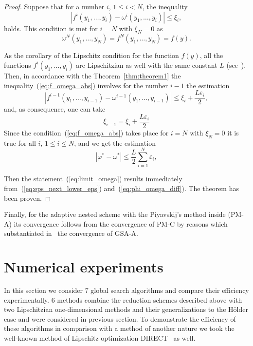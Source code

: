 \documentclass[preprint]{elsarticle}
\begin{document}
\begin{proof}
  Suppose that for a number $i$, $1 \leq i < N$, the inequality
  \begin{equation}
    \label{eq:f_omega_abs}
    | f^i(y_1, \dots, y_i) - \omega^i(y_1, \dots, y_i) | \leq \xi_i,
  \end{equation}
  holds. This condition is met for $i = N$ with $\xi_N = 0$ as
  \begin{equation}
    \omega^N(y_1, \dots, y_N) = f^N(y_1, \dots, y_N) = f(y).
  \end{equation}

  As the corollary of the Lipschitz condition for the function $f(y)$, all the functions $f^i(y_1, \dots, y_i)$ are Lipschitzian as well with the same constant $L$ (see~\cite{bib51}). Then, in accordance with the Theorem~\ref{thm:theorem1} the inequality~(\ref{eq:f_omega_abs}) involves for the number $i - 1$ the estimation
  \begin{equation}
    | f^{i - 1}(y_1, \dots, y_{i - 1}) - \omega^{i - 1}(y_1, \dots, y_{i - 1}) | \leq \xi_i + \frac{L \varepsilon_i}{2},
  \end{equation}
  and, as consequence, one can take
  \begin{equation}
    \xi_{i - 1} = \xi_i + \frac{L \varepsilon_i}{2}
  \end{equation}
  Since the condition~(\ref{eq:f_omega_abs}) takes place for $i = N$ with $\xi_N = 0$ it is true for all $i$, $1 \leq i \leq N$, and we get the estimation
  \begin{equation}
    \label{eq:phi_omega_diff}
    | \varphi^* - \omega^* | \leq \frac{L}{2} \sum_{i = 1}^N \varepsilon_i,
  \end{equation}

  Then the statement~(\ref{eq:limit_omega}) results immediately from~(\ref{eq:eps_next_lower_eps}) and~(\ref{eq:phi_omega_diff}). The theorem has been proven.
\end{proof}

Finally, for the adaptive nested scheme with the Piyavskij's method inside (PM-A) its convergence follows from the convergence of PM-C by reasons which substantiated in~\cite{bib38} the convergence of GSA-A.

\section{Numerical experiments}
\label{sec:num_exp}
In this section we consider 7 global search algorithms and compare their efficiency experimentally. 6 methods combine the reduction schemes described above with two Lipschitzian one-dimensional methods and their generalizations to the H\"older case and were considered in previous section. To demonstrate the efficiency of these algorithms in comparison with a method of another nature we took the well-known method of Lipschitz optimization DIRECT~\cite{bib23,bib24} as well.
\end{document}
